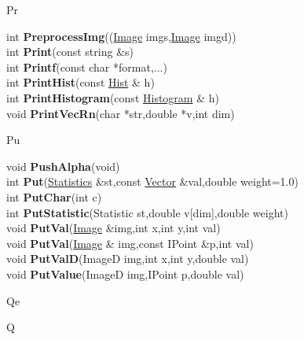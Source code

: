 \documentclass[10pt,titlepage]{article}
\def\functionlistentry#1#2#3#4#5#6{\noindent #1 {\bf #2}(#3) \dotfill #6\\}
\def\letterref#1{}
\def\letterlabel#1{\vspace{0.5cm}\centerline{\Large #1}}
\def\letterlabelend#1{}
\begin{document}
{{\letterlabel{Pr}
\letterref{A}
\letterref{B}
\letterref{C}
\letterref{D}
\letterref{E}
\letterref{F}
\letterref{G}
\letterref{H}
\letterref{I}
\letterref{K}
\letterref{L}
\letterref{M}
\letterref{N}
\letterref{O}
\letterref{P}
\letterref{Q}
\letterref{R}
\letterref{S}
\letterref{T}
\letterref{U}
\letterref{V}
\letterref{W}
\letterref{X}
\letterref{Y}
\letterref{Z}

\letterref{Pa}
\letterref{Pe}
\letterref{Ph}
\letterref{Po}
\letterref{Pr}
\letterref{Pu}
\letterlabelend{Pr}
\functionlistentry{int}{PreprocessImg}{(\hyperlink{Image}{Image} imgs,\hyperlink{Image}{Image} imgd)}{1254}{registration}{}
\functionlistentry{int}{Print}{const string \&s}{1432}{genericTools}{}
\functionlistentry{int}{Printf}{const char *format,...}{1431}{genericTools}{}
\functionlistentry{int}{PrintHist}{const \hyperlink{Hist}{Hist} \& h}{915}{statistics}{}
\functionlistentry{int}{PrintHistogram}{const \hyperlink{Histogram}{Histogram} \& h}{902}{statistics}{}
\functionlistentry{void}{PrintVecRn}{char *str,double *v,int dim}{1574}{obsolet}{}

\letterlabel{Pu}
\letterref{A}
\letterref{B}
\letterref{C}
\letterref{D}
\letterref{E}
\letterref{F}
\letterref{G}
\letterref{H}
\letterref{I}
\letterref{K}
\letterref{L}
\letterref{M}
\letterref{N}
\letterref{O}
\letterref{P}
\letterref{Q}
\letterref{R}
\letterref{S}
\letterref{T}
\letterref{U}
\letterref{V}
\letterref{W}
\letterref{X}
\letterref{Y}
\letterref{Z}

\letterref{Pa}
\letterref{Pe}
\letterref{Ph}
\letterref{Po}
\letterref{Pr}
\letterref{Pu}
\letterlabelend{Pu}
\functionlistentry{void}{PushAlpha}{void}{1419}{genericTools}{}
\functionlistentry{int}{Put}{\hyperlink{Statistics}{Statistics} \&st,const \hyperlink{Vector}{Vector} \&val,double weight=1.0}{867}{statistics}{}
\functionlistentry{int}{PutChar}{int c}{1428}{genericTools}{}
\functionlistentry{int}{PutStatistic}{Statistic st,double v[dim],double weight}{1595}{obsolet}{}
\functionlistentry{void}{PutVal}{\hyperlink{Image}{Image} \&img,int x,int y,int val}{64}{Images}{}
\functionlistentry{void}{PutVal}{\hyperlink{Image}{Image} \& img,const IPoint \&p,int val}{67}{Images}{}
\functionlistentry{void}{PutValD}{ImageD img,int x,int y,double val}{80}{Images}{}
\functionlistentry{void}{PutValue}{ImageD img,IPoint p,double val}{82}{Images}{}

\letterlabel{Qe}
\letterlabel{Q}
\letterref{A}
\letterref{B}
\letterref{C}
\letterref{D}
\letterref{E}
\letterref{F}
\letterref{G}
\letterref{H}
\letterref{I}
\letterref{K}
\letterref{L}
\letterref{M}
\letterref{N}
\letterref{O}
\letterref{P}
\letterref{Q}
\letterref{R}
\letterref{S}
\letterref{T}
\letterref{U}
\letterref{V}
\letterref{W}
\letterref{X}
\letterref{Y}
\letterref{Z}

}}
\end{document}
